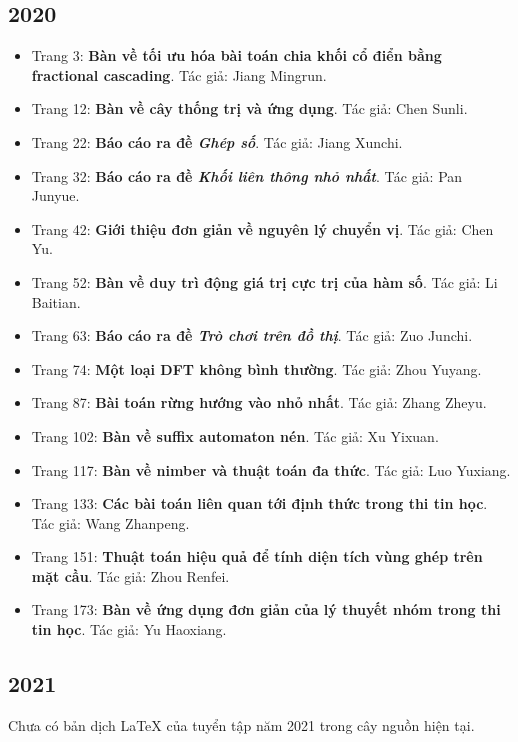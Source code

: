 \documentclass[11pt]{article}
\begin{document}
\subsection{2020}
\begin{itemize}[leftmargin=2em]
  \item Trang 3: \textbf{Bàn về tối ưu hóa bài toán chia khối cổ điển bằng fractional cascading}. Tác giả: Jiang Mingrun.
  \item Trang 12: \textbf{Bàn về cây thống trị và ứng dụng}. Tác giả: Chen Sunli.
  \item Trang 22: \textbf{Báo cáo ra đề \emph{Ghép số}}. Tác giả: Jiang Xunchi.
  \item Trang 32: \textbf{Báo cáo ra đề \emph{Khối liên thông nhỏ nhất}}. Tác giả: Pan Junyue.
  \item Trang 42: \textbf{Giới thiệu đơn giản về nguyên lý chuyển vị}. Tác giả: Chen Yu.
  \item Trang 52: \textbf{Bàn về duy trì động giá trị cực trị của hàm số}. Tác giả: Li Baitian.
  \item Trang 63: \textbf{Báo cáo ra đề \emph{Trò chơi trên đồ thị}}. Tác giả: Zuo Junchi.
  \item Trang 74: \textbf{Một loại DFT không bình thường}. Tác giả: Zhou Yuyang.
  \item Trang 87: \textbf{Bài toán rừng hướng vào nhỏ nhất}. Tác giả: Zhang Zheyu.
  \item Trang 102: \textbf{Bàn về suffix automaton nén}. Tác giả: Xu Yixuan.
  \item Trang 117: \textbf{Bàn về nimber và thuật toán đa thức}. Tác giả: Luo Yuxiang.
  \item Trang 133: \textbf{Các bài toán liên quan tới định thức trong thi tin học}. Tác giả: Wang Zhanpeng.
  \item Trang 151: \textbf{Thuật toán hiệu quả để tính diện tích vùng ghép trên mặt cầu}. Tác giả: Zhou Renfei.
  \item Trang 173: \textbf{Bàn về ứng dụng đơn giản của lý thuyết nhóm trong thi tin học}. Tác giả: Yu Haoxiang.
\end{itemize}

\subsection{2021}
Chưa có bản dịch LaTeX của tuyển tập năm 2021 trong cây nguồn hiện tại.
\end{document}
